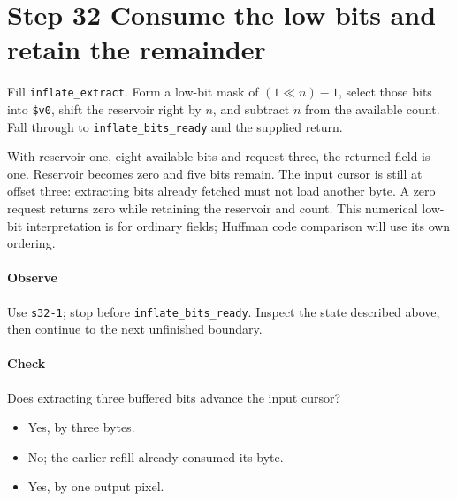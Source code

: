 \section{Step 32 Consume the low bits and retain the remainder}\label{png-inflate-s32}
Fill \texttt{inflate\_extract}. Form a low-bit mask of $(1\ll n)-1$, select those bits into \texttt{\$v0}, shift the reservoir right by $n$, and subtract $n$ from the available count. Fall through to \texttt{inflate\_bits\_ready} and the supplied return.

With reservoir one, eight available bits and request three, the returned field is one. Reservoir becomes zero and five bits remain. The input cursor is still at offset three: extracting bits already fetched must not load another byte. A zero request returns zero while retaining the reservoir and count. This numerical low-bit interpretation is for ordinary fields; Huffman code comparison will use its own ordering.

\paragraph{Observe} Use \texttt{s32-1}; stop before \texttt{inflate\_bits\_ready}. Inspect the state described above, then continue to the next unfinished boundary.

\paragraph{Check} Does extracting three buffered bits advance the input cursor?
\begin{itemize}
  \item[A.] Yes, by three bytes.
  \item[B.] No; the earlier refill already consumed its byte.
  \item[C.] Yes, by one output pixel.
\end{itemize}
